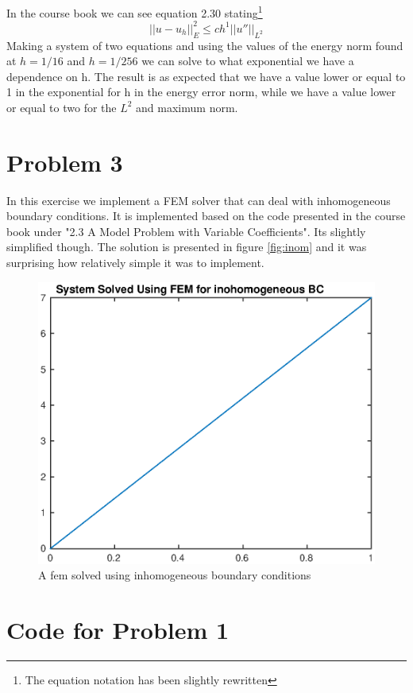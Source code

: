 \documentclass[11pt]{article}
\begin{document}
In the course book we can see equation 2.30 stating\footnote{The equation notation has been slightly rewritten}
\begin{equation}
	|| u - u_h ||^2_E \leq c h^1 ||u''||_{L^2}
\end{equation}
Making a system of two equations and using the values of the energy norm found at $h = 1/16$ and $h = 1/256$ we can solve to what exponential we have a dependence on h. The result is as expected that we have a value lower or equal to 1 in the exponential for h in the energy error norm, while we have a value lower or equal to two for the $L^2$ and maximum norm. 

\section{Problem 3}
In this exercise we implement a FEM solver that can deal with inhomogeneous boundary conditions. It is implemented based on the code presented in the course book under "2.3 A Model Problem with Variable Coefficients". Its slightly simplified though. The solution is presented in figure \ref{fig:inom} and it was surprising how relatively simple it was to implement. 
\begin{figure}[H]
	\centering
	\includegraphics[width=1\textwidth]{../ex3/inhom}
	\caption{A fem solved using inhomogeneous boundary conditions}
	\label{fig:inhom}
\end{figure}


\newpage
\appendix
\section{Code for Problem 1}
\end{document}
